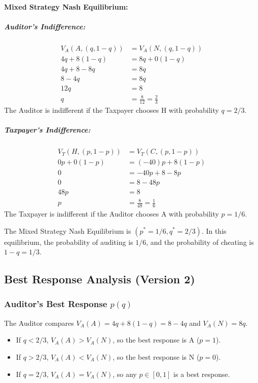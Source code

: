 \documentclass{article}
\begin{document}
\paragraph{Mixed Strategy Nash Equilibrium:}
\subparagraph{Auditor's Indifference:}
\begin{align*} V_A(A, (q, 1-q)) &= V_A(N, (q, 1-q)) \\ 4q + 8(1-q) &= 8q + 0(1-q) \\ 4q + 8 - 8q &= 8q \\ 8 - 4q &= 8q \\ 12q &= 8 \\ q &= \frac{8}{12} = \frac{2}{3} \end{align*}
The Auditor is indifferent if the Taxpayer chooses H with probability $q=2/3$.

\subparagraph{Taxpayer's Indifference:}
\begin{align*} V_T(H, (p, 1-p)) &= V_T(C, (p, 1-p)) \\ 0p + 0(1-p) &= (-40)p + 8(1-p) \\ 0 &= -40p + 8 - 8p \\ 0 &= 8 - 48p \\ 48p &= 8 \\ p &= \frac{8}{48} = \frac{1}{6} \end{align*}
The Taxpayer is indifferent if the Auditor chooses A with probability $p=1/6$.

The Mixed Strategy Nash Equilibrium is $(p^* = 1/6, q^* = 2/3)$.
In this equilibrium, the probability of auditing is $1/6$, and the probability of cheating is $1-q = 1/3$.

\subsection{Best Response Analysis (Version 2)}

\subsubsection{Auditor's Best Response $p(q)$}
The Auditor compares $V_A(A) = 4q + 8(1-q) = 8-4q$ and $V_A(N) = 8q$.
\begin{itemize}
    \item If $q < 2/3$, $V_A(A) > V_A(N)$, so the best response is A ($p=1$).
    \item If $q > 2/3$, $V_A(A) < V_A(N)$, so the best response is N ($p=0$).
    \item If $q = 2/3$, $V_A(A) = V_A(N)$, so any $p \in [0,1]$ is a best response.
\end{itemize}
\end{document}

